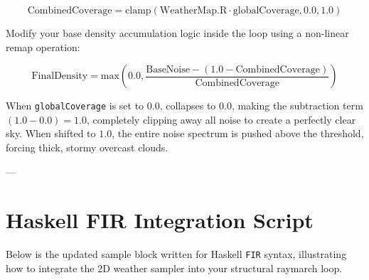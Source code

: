 \documentclass[11pt,a4paper]{article}
\begin{document}
\begin{equation}
    \text{CombinedCoverage} = \text{clamp}(\text{WeatherMap.R} \cdot \text{globalCoverage}, 0.0, 1.0)
\end{equation}

Modify your base density accumulation logic inside the loop using a non-linear remap operation:

\begin{equation}
    \text{FinalDensity} = \text{max}\left(0.0, \frac{\text{BaseNoise} - (1.0 - \text{CombinedCoverage})}{\text{CombinedCoverage}}\right)
\end{equation}

When \texttt{globalCoverage} is set to $0.0$,  collapses to $0.0$, making the subtraction term $(1.0 - 0.0) = 1.0$, completely clipping away all noise to create a perfectly clear sky. When shifted to $1.0$, the entire noise spectrum is pushed above the threshold, forcing thick, stormy overcast clouds.

---

\section{Haskell FIR Integration Script}
Below is the updated sample block written for Haskell \texttt{FIR} syntax, illustrating how to integrate the 2D weather sampler into your structural raymarch loop.
\end{document}

